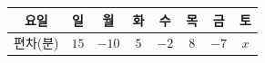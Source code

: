 {\renewcommand{\arraystretch}{1.35}\small
\begin{tabular}{|c|c|c|c|c|c|c|c|}
\hline
요일 & 일 & 월 & 화 & 수 & 목 & 금 & 토 \\ \hline
편차(분) & $15$ & $-10$ & $5$ & $-2$ & $8$ & $-7$ & $x$ \\ \hline
\end{tabular}}
